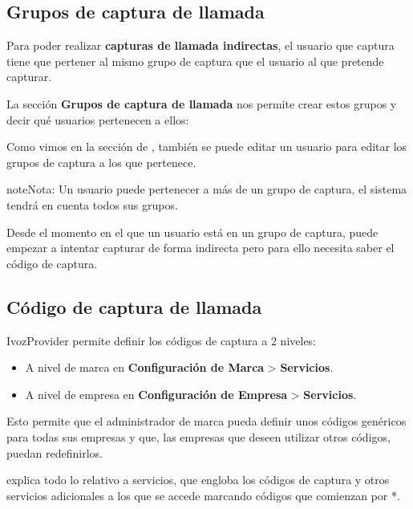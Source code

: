 \documentclass[letterpaper,10pt,spanish]{sphinxmanual}
\begin{document}
\subsection{Grupos de captura de llamada}
\label{pbx_features/call_captures:grupos-de-captura-de-llamada}
Para poder realizar \textbf{capturas de llamada indirectas}, el usuario que captura tiene que pertener al mismo grupo de captura que el usuario al que pretende capturar.

La sección \textbf{Grupos de captura de llamada} nos permite crear estos grupos y decir qué usuarios pertenecen a ellos:

\noindent{}

Como vimos en la sección de {\hyperref[pbx_features/users:users]{}}, también se puede editar un usuario para editar los grupos de captura a los que pertenece.

\begin{notice}{note}{Nota:}
Un usuario puede pertenecer a más de un grupo de captura, el sistema tendrá en cuenta todos sus grupos.
\end{notice}

Desde el momento en el que un usuario está en un grupo de captura, puede empezar a intentar capturar de forma indirecta pero para ello necesita saber el código de captura.


\subsection{Código de captura de llamada}
\label{pbx_features/call_captures:codigo-de-captura-de-llamada}
IvozProvider permite definir los códigos de captura a 2 niveles:
\begin{itemize}
\item {} 
A nivel de marca en \textbf{Configuración de Marca} \textgreater{} \textbf{Servicios}.

\item {} 
A nivel de empresa en \textbf{Configuración de Empresa} \textgreater{} \textbf{Servicios}.

\end{itemize}

Esto permite que el administrador de marca pueda definir unos códigos genéricos para todas sus empresas y que, las empresas que deseen utilizar otros códigos, puedan redefinirlos.

{\hyperref[pbx_features/services:services]{}} explica todo lo relativo a servicios, que engloba los códigos de captura y otros servicios adicionales a los que se accede marcando códigos que comienzan por *.
\end{document}
